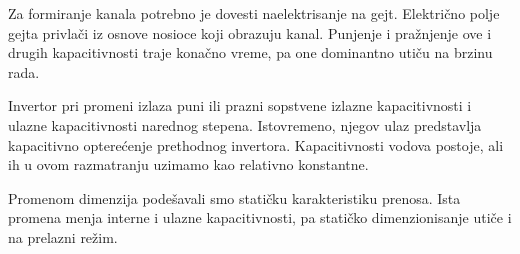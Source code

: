 Za formiranje kanala potrebno je dovesti naelektrisanje na gejt. Električno polje gejta privlači iz osnove nosioce koji obrazuju kanal. Punjenje i pražnjenje ove i drugih kapacitivnosti traje konačno vreme, pa one dominantno utiču na brzinu rada.

Invertor pri promeni izlaza puni ili prazni sopstvene izlazne kapacitivnosti i ulazne kapacitivnosti narednog stepena. Istovremeno, njegov ulaz predstavlja kapacitivno opterećenje prethodnog invertora. Kapacitivnosti vodova postoje, ali ih u ovom razmatranju uzimamo kao relativno konstantne.

Promenom dimenzija podešavali smo statičku karakteristiku prenosa. Ista promena menja interne i ulazne kapacitivnosti, pa statičko dimenzionisanje utiče i na prelazni režim.
